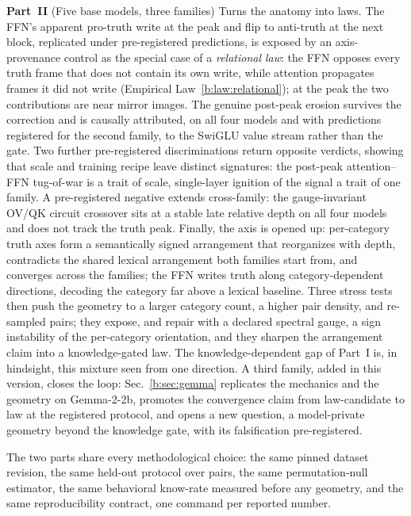 \documentclass[11pt]{article}
\begin{document}
\textbf{Part~II}  (Five base models, three families) Turns the anatomy into
laws. The FFN's apparent pro-truth write at the peak and flip to anti-truth
at the next block, replicated under pre-registered predictions, is exposed
by an axis-provenance control as the special case of a \emph{relational
law}: the FFN opposes every truth frame that does not contain its own
write, while attention propagates frames it did not write
(Empirical Law~\ref{b:law:relational}); at the peak the two contributions
are near mirror images. The genuine post-peak erosion survives the
correction and is causally attributed, on all four models and with
predictions registered for the second family, to the SwiGLU value stream
rather than the gate. Two further pre-registered discriminations return
opposite verdicts, showing that scale and training recipe leave distinct
signatures: the post-peak attention--FFN tug-of-war is a trait of scale,
single-layer ignition of the signal a trait of one family. A pre-registered
negative extends cross-family: the gauge-invariant OV/QK circuit crossover
sits at a stable late relative depth on all four models and does not track
the truth peak. Finally, the axis is opened up: per-category truth axes
form a semantically signed arrangement that reorganizes with depth,
contradicts the shared lexical arrangement both families start from, and
converges across the families; the FFN writes truth along
category-dependent directions, decoding the category far above a lexical
baseline. Three stress tests then push the geometry to a larger
category count, a higher pair density, and re-sampled pairs; they
expose, and repair with a declared spectral gauge, a sign instability
of the per-category orientation, and they sharpen the arrangement claim
into a knowledge-gated law. The knowledge-dependent gap of Part~I is, in hindsight, this
mixture seen from one direction. A third family, added in this version,
closes the loop: Sec.~\ref{b:sec:gemma} replicates the mechanics and the
geometry on Gemma-2-2b, promotes the convergence claim from law-candidate
to law at the registered protocol, and opens a new question, a
model-private geometry beyond the knowledge gate, with its falsification
pre-registered.

The two parts share every methodological choice: the same pinned dataset
revision, the same held-out protocol over pairs, the same permutation-null
estimator, the same behavioral know-rate measured before any geometry, and
the same reproducibility contract, one command per reported number.
\end{document}

